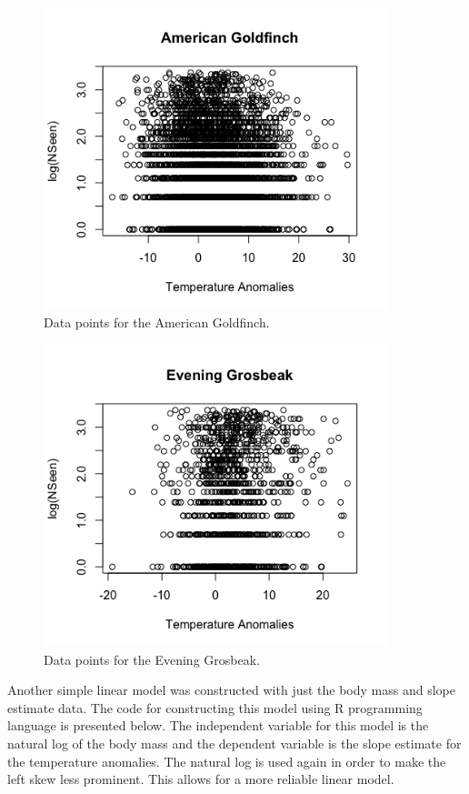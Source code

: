 \begin{figure}[h]
\centering
\includegraphics[width=10cm]{figures/amegfi_plot.png}
\caption{Data points for the American Goldfinch.}
\end{figure}

\begin{figure}[h]
\centering
\includegraphics[width=10cm]{figures/evegros_plot.png}
\caption{Data points for the Evening Grosbeak.}
\end{figure}

Another simple linear model was constructed with just the body mass and slope estimate data. The code for constructing this model using R programming language is presented below. The independent variable for this model is the natural log of the body mass and the dependent variable is the slope estimate for the temperature anomalies. The natural log is used again in order to make the left skew less prominent. This allows for a more reliable linear model.  

